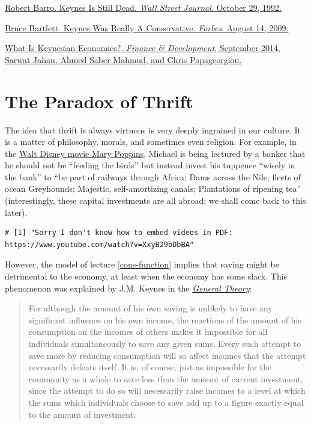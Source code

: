 \documentclass[]{book}
\theoremstyle{definition}
\theoremstyle{definition}
\theoremstyle{definition}
\theoremstyle{remark}
\begin{document}
\href{https://search.proquest.com/docview/398378701/fulltext/CBD1D9A468D04A85PQ/4?accountid=14512}{Robert
Barro. Keynes Is Still Dead. \emph{Wall Street Journal}. October 29,
1992.}

\href{https://www.forbes.com/2009/08/13/john-maynard-keynes-conservative-opinions-columnists-bruce-bartlett.html}{Bruce
Bartlett. Keynes Was Really A Conservative. \emph{Forbes}. August 14,
2009.}

\href{http://www.imf.org/external/pubs/ft/fandd/2014/09/pdf/basics.pdf}{What
Is Keynesian Economics?, \emph{Finance \& Development}, September 2014,
Sarwat Jahan, Ahmed Saber Mahmud, and Chris Papageorgiou.}

\chapter{The Paradox of Thrift}\label{paradox-thrift}

The idea that thrift is always virtuous is very deeply ingrained in our
culture. It is a matter of philosophy, morals, and sometimes even
religion. For example, in the
\href{https://www.youtube.com/watch?v=XxyB29bDbBA}{Walt Disney movie
Mary Poppins}, Michael is being lectured by a banker that he should not
be ``feeding the birds'' but instead invest his tuppence ``wisely in the
bank'' to ``be part of railways through Africa; Dams across the Nile,
fleets of ocean Greyhounds; Majestic, self-amortizing canals;
Plantations of ripening tea'' (interestingly, these capital investments
are all abroad; we shall come back to this later).

\begin{verbatim}
# [1] "Sorry I don't know how to embed videos in PDF: https://www.youtube.com/watch?v=XxyB29bDbBA"
\end{verbatim}

However, the model of lecture \ref{cons-function} implies that saving
might be detrimental to the economy, at least when the economy has some
slack. This phenomenon was explained by J.M. Keynes in the
\href{http://cas2.umkc.edu/economics/people/facultypages/kregel/courses/econ645/winter2011/generaltheory.pdf}{\emph{General
Theory}}:

\begin{quote}
For although the amount of his own saving is unlikely to have any
significant influence on his own income, the reactions of the amount of
his consumption on the incomes of others makes it impossible for all
individuals simultaneously to save any given sums. Every such attempt to
save more by reducing consumption will so affect incomes that the
attempt necessarily defeats itself. It is, of course, just as impossible
for the community as a whole to save less than the amount of current
investment, since the attempt to do so will necessarily raise incomes to
a level at which the sums which individuals choose to save add up to a
figure exactly equal to the amount of investment.
\end{quote}
\end{document}
